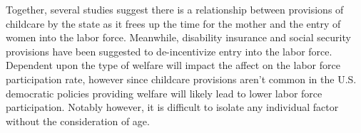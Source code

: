 Together, several studies suggest there is a relationship between provisions of childcare by the state as it frees up the time for the mother and the entry of women into the labor force. Meanwhile, disability insurance and social security provisions have been suggested to de-incentivize entry into the labor force. Dependent upon the type of welfare will impact the affect on the labor force participation rate, however since childcare provisions aren't common in the U.S. democratic policies providing welfare will likely lead to lower labor force participation. Notably however, it is difficult to isolate any individual factor without the consideration of age.